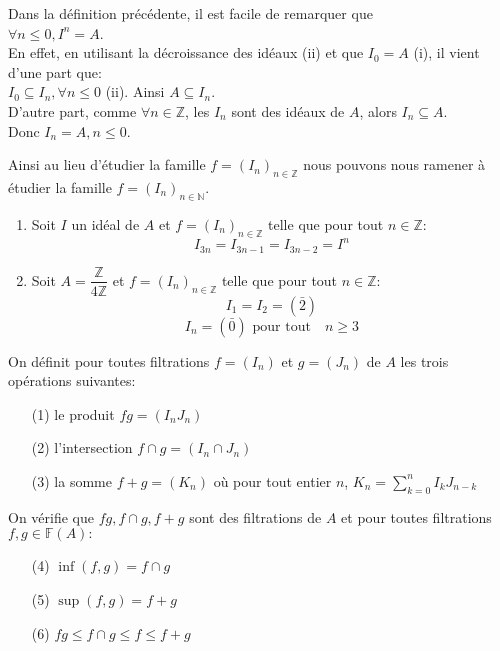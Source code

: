 \begin{maremarque}
	Dans la définition précédente, il est facile de remarquer que\\ $\forall n \leq 0, I^n = A$.\\ En effet, en utilisant la décroissance des idéaux (ii) et que $I_0 = A$ (i), il vient d'une part que: \\ $I_0 \subseteq I_n , \forall n \leq 0$ (ii). Ainsi $A \subseteq I_n$.\\
	D'autre part, comme $\forall n \in \mathbb{Z}$, les $I_n$ sont des idéaux de $A$, alors $I_n \subseteq A$.\\
	Donc $I_n = A, n \leq 0$.
\end{maremarque}
Ainsi au lieu d'étudier la famille $f = (I_n)_{n \in \mathbb{Z}}$ nous pouvons nous ramener à étudier la famille $f = (I_n)_{n \in \mathbb{N}}$.

\begin{monexemple}
	\begin{enumerate}
		\item 	Soit $I$ un idéal de $A$ et $f=(I_n)_{n \in \mathbb{Z}}$ telle que pour tout $n \in \mathbb{Z}$:
		$$I_{3n} = I_{3n-1} = I_{3n-2} =I^{n} $$
		\item 	Soit $A = \dfrac{\mathbb{Z}}{4 \mathbb{Z}} $ et $f=(I_n)_{n \in \mathbb{Z}}$ telle que pour tout $n \in \mathbb{Z}$:
		$$I_1 = I_2 = (\bar{2})$$
		$$I_n = (\bar{0})  \text{ pour tout} \quad n \geqslant 3 $$
	\end{enumerate}
\end{monexemple}
\begin{madefinition}
	On définit pour toutes filtrations $f=(I_n)$ et $g=(J_n)$ de $A$ les trois opérations suivantes: 
	\begin{enumerate}
		\item[(1)] le produit $fg=(I_nJ_n)$
		\item[(2)] l'intersection $f \cap g = (I_n \cap J_n)$
		\item[(3)] la somme $f+g=(K_n)$ où pour tout entier $n$, $K_n =\displaystyle  \sum_{k=0}^{n}I_{k}J_{n-k} $
	\end{enumerate}
	On vérifie que $fg, f \cap g, f + g$ sont des filtrations de $A$ et pour toutes filtrations \\ $f,g \in \mathbb{F}(A):$
	\begin{enumerate}
		\item[(4)] $\inf (f,g) = f \cap g$
		\item[(5)] $\sup (f,g) = f+g $
		\item[(6)] $fg \leqslant f \cap g \leqslant f \leqslant f+g$
	\end{enumerate}
\end{madefinition}

